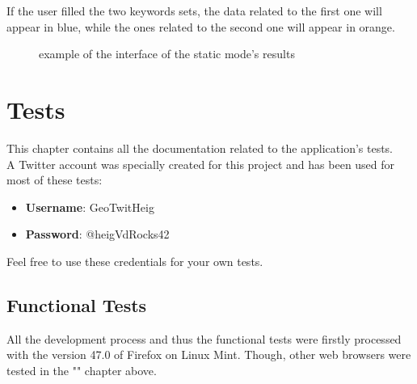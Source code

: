 \documentclass[a4paper,11pt]{report}
\begin{document}
If the user filled the two keywords sets, the data related to the first one will appear in \color{blue}blue\color{black}, while the ones related to the second one will appear in \color{Orange}orange\color{black}.
\begin{figure}[H]
\vspace{-5pt}
\begin{center}
\vspace{-20pt}
\caption{example of the interface of the static mode's results}
\end{center}
\end{figure}
\vspace{-10pt}

\chapter{Tests}
\label{tests}
This chapter contains all the documentation related to the application's tests.\\
A Twitter account was specially created for this project and has been used for most of these tests:
\begin{itemize}
	\item \textbf{Username}: GeoTwitHeig
	\item \textbf{Password}: @heigVdRocks42
\end{itemize}
Feel free to use these credentials for your own tests.
\bigskip

\section{Functional Tests}
All the development process and thus the functional tests were firstly processed with the version 47.0 of Firefox on Linux Mint. Though, other web browsers were tested in the "" chapter above.
\end{document}

